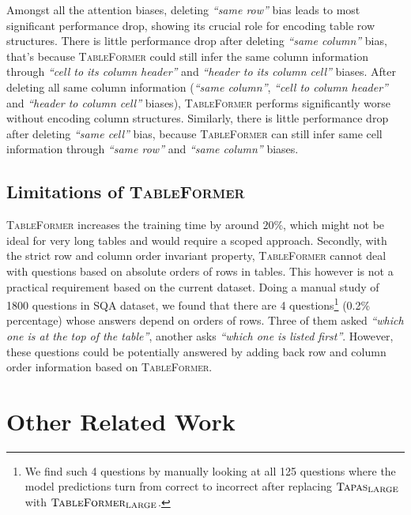 \documentclass[11pt]{article}
\begin{document}
Amongst all the attention biases, deleting \emph{``same row''} bias leads to most significant performance drop, showing its crucial role for encoding table row structures. There is little performance drop after deleting \emph{``same column''} bias, that's because \textsc{TableFormer} could still infer the same column information through \emph{``cell to its column header''} and \emph{``header to its column cell''} biases. After deleting all same column information (\emph{``same column''}, \emph{``cell to column header''} and \emph{``header to column cell''} biases), \textsc{TableFormer} performs significantly worse without encoding column structures. Similarly, there is little performance drop after deleting \emph{``same cell''} bias, because \textsc{TableFormer} can still infer same cell information through \emph{``same row''} and \emph{``same column''} biases. %

\subsection{Limitations of \textsc{TableFormer}}

\textsc{TableFormer} increases the  training time by around $20\%$, which might not be ideal for very long tables and would require a scoped approach.
Secondly, with the strict row and column order invariant property, \textsc{TableFormer} cannot deal with questions based on absolute orders of rows in tables. This however is not a practical requirement based on the current dataset. Doing a manual study of 1800 questions in SQA dataset, we found that there are 4 questions\footnote{We find such 4 questions by manually looking at all 125 questions where the model predictions turn from correct to incorrect after replacing $\textsc{Tapas}_{\text{LARGE}}$ with $\textsc{TableFormer}_{\text{LARGE}}$.} (0.2\% percentage) whose answers depend on orders of rows. Three of them asked \emph{``which one is at the top of the table''}, another asks \emph{``which one is listed first''}. However, these questions could be potentially answered by adding back row and column order information based on \textsc{TableFormer}. 


\section{Other Related Work}
\end{document}
